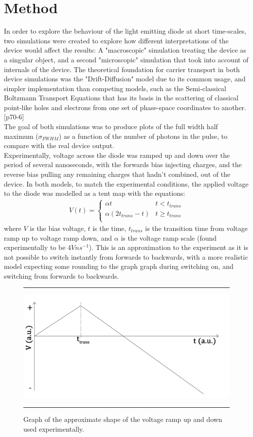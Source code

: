 \documentclass[titlepage]{article}
\begin{document}
\section{Method}\label{sec:Method}
In order to explore the behaviour of the light emitting diode at short time-scales, two simulations were created to explore how different interpretations of the device would affect the results: A "macroscopic" simulation treating the device as a singular object, and a second "microscopic" simulation that took into account of internals of the device. The theoretical foundation for carrier transport in both device simulations was the "Drift-Diffusion" model due to its common usage, and simpler implementation than competing models, such as the Semi-classical Boltzmann Transport Equations that has its basis in the scattering of classical point-like holes and electrons from one set of phase-space coordinates to another.\cite{NSD}[p70-6] \\
The goal of both simulations was to produce plots of the full width half maximum ($\sigma_{FWHM}$) as a function of the number of photons in the pulse, to compare with the real device output.\\
Experimentally, voltage across the diode was ramped up and down over the period of several nanoseconds, with the forwards bias injecting charges, and the reverse bias pulling any remaining charges that hadn't combined, out of the device. In both models, to match the experimental conditions, the applied voltage to the diode was modelled as a tent map with the equations:
\begin{eqnarray}
	V(t) = \begin{cases}
	\alpha t &t < t_{trans}\\
	\alpha(2t_{trans} - t) &t \geq t_{trans}\\
	\end{cases}
\end{eqnarray}
where $V$ is the bias voltage, $t$ is the time, $t_{trans}$ is the transition time from voltage ramp up to voltage ramp down, and $\alpha$ is the voltage ramp scale (found experimentally to be $4Vns^{-1}$). This is an approximation to the experiment as it is not possible to switch instantly from forwards to backwards, with a more realistic model expecting some rounding to the graph graph during switching on, and switching from forwards to backwards. 
\begin{figure}[t]
	\hrule
	\centering
	\includegraphics[scale=0.12]{Figures/V_tent}
	\caption{\label{graph:V_tent}Graph of the approximate shape of the voltage ramp up and down used experimentally.}
	\hrule
\end{figure}
\end{document}
